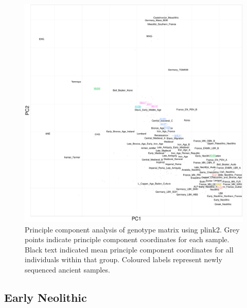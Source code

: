 \begin{figure}[htp]
    \centering
    \includegraphics[width=1.0\textwidth]{../images/chapter4/plink_PCA.pdf}
    \caption{Principle component analysis of genotype matrix using plink2. Grey points indicate principle component coordinates for each sample. Black text indicated mean principle component coordinates for all individuals within that group. Coloured labels represent newly sequenced ancient samples.}
    \label{fig:plink_PCA}
\end{figure}

\subsection{Early Neolithic}

